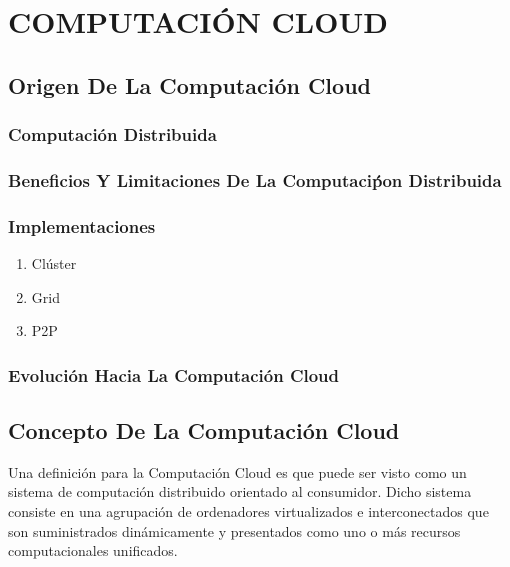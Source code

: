 \documentclass[a4paper, 12pt]{report}
\begin{document}
\chapter{COMPUTACI\'ON CLOUD}
\pagestyle{plain}
\vspace*{-2em}
\begin{justify}
\end{justify}
\section{Origen De La Computaci\'on Cloud}
\subsection{Computaci\'on Distribuida}
\subsection{Beneficios Y Limitaciones De La Computaci\'pon Distribuida}
\subsection{Implementaciones}
\begin{enumerate}[label=\alph*)]
    \item{Cl\'uster}
    \item{Grid}
    \item{P2P}
\end{enumerate}
\subsection{Evoluci\'on Hacia La Computaci\'on Cloud}
\section{Concepto De La Computaci\'on Cloud}
\begin{justify}
Una definici\'on para la Computaci\'on Cloud es que puede ser visto como un sistema de computaci\'on distribuido orientado al consumidor. Dicho sistema consiste en una agrupaci\'on de ordenadores virtualizados e interconectados que son suministrados din\'amicamente y presentados como uno o m\'as recursos computacionales unificados.
\end{justify}
\end{document}
